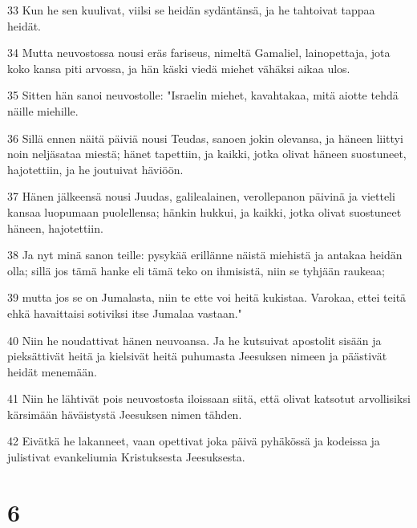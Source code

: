 \par 33 Kun he sen kuulivat, viilsi se heidän sydäntänsä, ja he tahtoivat tappaa heidät.
\par 34 Mutta neuvostossa nousi eräs fariseus, nimeltä Gamaliel, lainopettaja, jota koko kansa piti arvossa, ja hän käski viedä miehet vähäksi aikaa ulos.
\par 35 Sitten hän sanoi neuvostolle: "Israelin miehet, kavahtakaa, mitä aiotte tehdä näille miehille.
\par 36 Sillä ennen näitä päiviä nousi Teudas, sanoen jokin olevansa, ja häneen liittyi noin neljäsataa miestä; hänet tapettiin, ja kaikki, jotka olivat häneen suostuneet, hajotettiin, ja he joutuivat häviöön.
\par 37 Hänen jälkeensä nousi Juudas, galilealainen, verollepanon päivinä ja vietteli kansaa luopumaan puolellensa; hänkin hukkui, ja kaikki, jotka olivat suostuneet häneen, hajotettiin.
\par 38 Ja nyt minä sanon teille: pysykää erillänne näistä miehistä ja antakaa heidän olla; sillä jos tämä hanke eli tämä teko on ihmisistä, niin se tyhjään raukeaa;
\par 39 mutta jos se on Jumalasta, niin te ette voi heitä kukistaa. Varokaa, ettei teitä ehkä havaittaisi sotiviksi itse Jumalaa vastaan."
\par 40 Niin he noudattivat hänen neuvoansa. Ja he kutsuivat apostolit sisään ja pieksättivät heitä ja kielsivät heitä puhumasta Jeesuksen nimeen ja päästivät heidät menemään.
\par 41 Niin he lähtivät pois neuvostosta iloissaan siitä, että olivat katsotut arvollisiksi kärsimään häväistystä Jeesuksen nimen tähden.
\par 42 Eivätkä he lakanneet, vaan opettivat joka päivä pyhäkössä ja kodeissa ja julistivat evankeliumia Kristuksesta Jeesuksesta.

\chapter{6}

